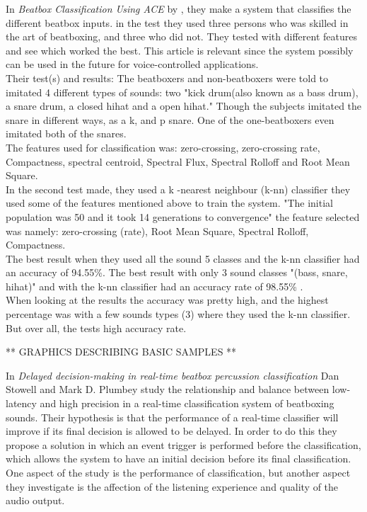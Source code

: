 In \textit{Beatbox Classification Using ACE} by \cite{Sinyor05}, they make a system that classifies the different beatbox inputs. in the test they used three persons who was skilled in the art of beatboxing, and three who did not.\cite{Sinyor05} They tested with different features and see which worked the best. This article is relevant since the system possibly can be used in the future for voice-controlled applications.\\
Their test(s) and results:
The beatboxers and non-beatboxers were told to imitated 4 different types of sounds: two "kick drum(also known as a bass drum), a snare drum, a closed hihat and a open hihat."\cite{Sinyor05} Though the subjects imitated the snare in different ways, as a k, and p snare. One of the one-beatboxers even imitated both of the snares.\\
The features \cite{Sinyor05} used for classification was: zero-crossing, zero-crossing rate, Compactness, spectral centroid, Spectral Flux, Spectral Rolloff and Root Mean Square\cite{Sinyor05}.\\
In the second test \cite{Sinyor05} made, they used a k -nearest neighbour (k-nn) classifier they used some of the features mentioned above to train the system. "The initial population was 50 and it took 14 generations to convergence" \cite{Sinyor05} the feature selected was namely: zero-crossing (rate), Root Mean Square, Spectral Rolloff, Compactness.\\ 
The best result when they used all the sound 5 classes and the k-nn classifier had an accuracy of 94.55\%. The best result with only 3 sound classes "(bass, snare, hihat)" \cite{Sinyor05} and with the k-nn classifier had an accuracy rate of 98.55\% \cite{Sinyor05}.\\
When looking at the results the accuracy was pretty high, and the highest percentage was with a few sounds types (3)  where they used the k-nn classifier. But over all, the tests high accuracy rate.

** GRAPHICS DESCRIBING BASIC SAMPLES ** 

In \textit{Delayed decision-making in real-time beatbox percussion classification} Dan Stowell and Mark D. Plumbey study the relationship and balance between low-latency and high precision in a real-time classification system of beatboxing sounds. Their hypothesis is that the performance of a real-time classifier will improve if its final decision is allowed to be delayed. 
In order to do this they propose a solution in which an event trigger is performed before the classification, which allows the system to have an initial decision before its final classification. One aspect of the study is the performance of classification, but another aspect they investigate is the affection of the listening experience and quality of the audio output. 

